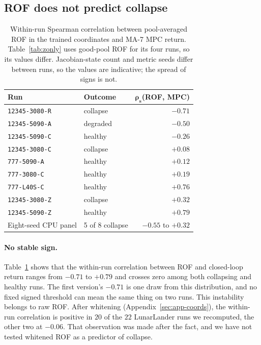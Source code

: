 \documentclass[11pt]{article}
\theoremstyle{remark}
\begin{document}
\subsection{ROF does not predict collapse}
\label{sec:rof-negative}

\begin{table}[htbp]
\centering
\small
\begin{tabular}{@{}l l r@{}}
\toprule
\textbf{Run} & \textbf{Outcome} & $\bm{\rho_s}$\textbf{(ROF, MPC)} \\
\midrule
\texttt{12345-3080-R} & collapse & $-0.71$ \\
\texttt{12345-5090-A} & degraded & $-0.50$ \\
\texttt{12345-5090-C} & healthy & $-0.26$ \\
\texttt{12345-3080-C} & collapse & $+0.08$ \\
\texttt{777-5090-A} & healthy & $+0.12$ \\
\texttt{777-3080-C} & healthy & $+0.19$ \\
\texttt{777-L40S-C} & healthy & $+0.76$ \\
\texttt{12345-3080-Z} & collapse & $+0.32$ \\
\texttt{12345-5090-Z} & healthy & $+0.79$ \\
Eight-seed CPU panel & 5 of 8 collapse & $-0.55$ to $+0.32$ \\
\bottomrule
\end{tabular}
\caption{Within-run Spearman correlation between pool-averaged ROF in the trained coordinates and MA-7 MPC return. Table~\ref{tab:zonly} uses good-pool ROF for its four runs, so its values differ. Jacobian-state count and metric seeds differ between runs, so the values are indicative; the spread of signs is not.}
\label{tab:sign}
\end{table}

\paragraph{No stable sign.} Table~\ref{tab:sign} shows that the within-run correlation between ROF and closed-loop return ranges from $-0.71$ to $+0.79$ and crosses zero among both collapsing and healthy runs. The first version's $-0.71$ is one draw from this distribution, and no fixed signed threshold can mean the same thing on two runs. This instability belongs to raw ROF. After whitening (Appendix~\ref{sec:app-coords}), the within-run correlation is positive in $20$ of the $22$ LunarLander runs we recomputed, the other two at $-0.06$. That observation was made after the fact, and we have not tested whitened ROF as a predictor of collapse.
\end{document}
